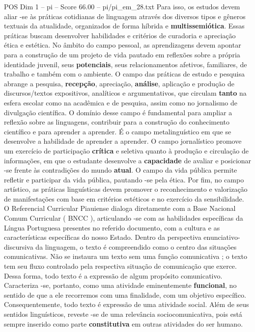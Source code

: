 \begin{textsample}{POS Dim 1 – pi – Score 66.00 – pi/pi\_em\_28.txt}
Para isso, os estudos devem aliar -se às práticas cotidianas de linguagem através dos diversos tipos e gêneros textuais da atualidade, organizados de forma híbrida e \textbf{multissemiótica}.
Essas práticas buscam desenvolver habilidades e critérios de curadoria e apreciação ética e estética.
No âmbito do campo pessoal, as aprendizagens devem apontar para a construção de um projeto de vida pautado em reflexões sobre a própria identidade juvenil, seus \textbf{potenciais}, seus relacionamentos afetivos, familiares, de trabalho e também com o ambiente.
O campo das práticas de estudo e pesquisa abrange a pesquisa, \textbf{recepção}, apreciação, \textbf{análise}, aplicação e produção de discursos/textos expositivos, analíticos e argumentativos, que circulam \textbf{tanto} na esfera escolar como na acadêmica e de pesquisa, assim como no jornalismo de divulgação científica.
O domínio desse campo é fundamental para ampliar a reflexão sobre as linguagens, contribuir para a construção do conhecimento científico e para aprender a aprender.
É o campo metalinguístico em que se desenvolve a habilidade de aprender a aprender.
O campo jornalístico promove um exercício de participação \textbf{crítica} e seletiva quanto à produção e circulação de informações, em que o estudante desenvolve a \textbf{capacidade} de avaliar e posicionar -se frente às contradições do mundo \textbf{atual}.
O campo da vida pública permite refletir e participar da vida pública, pautando -se pela ética.
Por fim, no campo artístico, as práticas linguísticas devem promover o reconhecimento e valorização de manifestações com base em critérios estéticos e no exercício da sensibilidade.
O Referencial Curricular Piauiense dialoga diretamente com a Base Nacional Comum Curricular ( BNCC ), articulando -se com as habilidades específicas da Língua Portuguesa presentes no referido documento, com a cultura e as características específicas do nosso Estado.
Dentro da perspectiva enunciativo-discursiva da linguagem, o texto é compreendido como o centro das situações comunicativas.
Não se instaura um texto sem uma função comunicativa ; o texto tem seu fluxo controlado pela respectiva situação de comunicação que exerce.
Dessa forma, todo texto é a expressão de algum propósito comunicativo.
Caracteriza -se, portanto, como uma atividade eminentemente \textbf{funcional}, no sentido de que a ele recorremos com uma finalidade, com um objetivo específico.
Consequentemente, todo texto é expressão de uma atividade social.
Além de seus sentidos linguísticos, reveste -se de uma relevância sociocomunicativa, pois está sempre inserido como parte \textbf{constitutiva} em outras atividades do ser humano.

\end{textsample}

